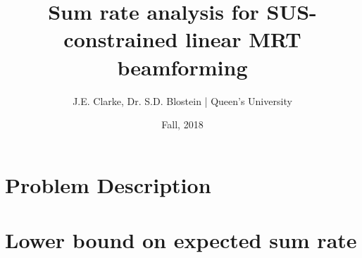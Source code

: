 \documentclass[11pt]{article}
\title{Sum rate analysis for SUS-constrained linear MRT beamforming}
\author{J.E. Clarke, Dr. S.D. Blostein | Queen's University}
\date{Fall, 2018}
\begin{document}
	\maketitle
	\newpage
	\section{Problem Description}
	    
	\section{Lower bound on expected sum rate}
	    
%	    
%	    
    \newpage	
 	\begingroup
 		\renewcommand{\section}[2]{}%
 		
 		
 	\endgroup
\end{document}

